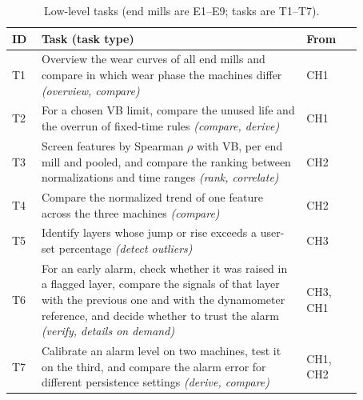 \begin{table}[t]
\centering\small
\caption{Low-level tasks (end mills are E1--E9; tasks are T1--T7).}
\label{tab:tasks}
\begin{tabular}{@{}p{0.07\linewidth}p{0.66\linewidth}p{0.14\linewidth}@{}}
\toprule
ID & Task (task type) & From \\
\midrule
T1 & Overview the wear curves of all end mills and compare in which wear phase the machines differ \emph{(overview, compare)} & CH1 \\
T2 & For a chosen VB limit, compare the unused life and the overrun of fixed-time rules \emph{(compare, derive)} & CH1 \\
T3 & Screen features by Spearman $\rho$ with VB, per end mill and pooled, and compare the ranking between normalizations and time ranges \emph{(rank, correlate)} & CH2 \\
T4 & Compare the normalized trend of one feature across the three machines \emph{(compare)} & CH2 \\
T5 & Identify layers whose jump or rise exceeds a user-set percentage \emph{(detect outliers)} & CH3 \\
T6 & For an early alarm, check whether it was raised in a flagged layer, compare the signals of that layer with the previous one and with the dynamometer reference, and decide whether to trust the alarm \emph{(verify, details on demand)} & CH3, CH1 \\
T7 & Calibrate an alarm level on two machines, test it on the third, and compare the alarm error for different persistence settings \emph{(derive, compare)} & CH1, CH2 \\
\bottomrule
\end{tabular}
\end{table}
